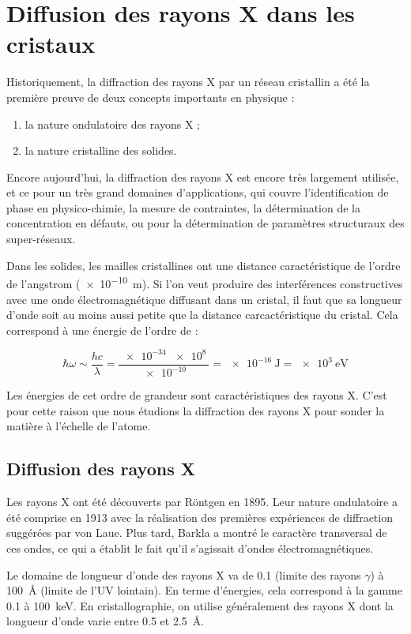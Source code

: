 \chapter{Diffusion des rayons X dans les cristaux}

Historiquement, la diffraction des rayons X par un réseau cristallin a été la première preuve de deux concepts importants en physique :
\begin{enumerate}
    \item la nature ondulatoire des rayons X ;
    \item la nature cristalline des solides.
\end{enumerate}
Encore aujourd'hui, la diffraction des rayons X est encore très largement utilisée, et ce pour un très grand domaines d'applications, qui couvre l'identification de phase en physico-chimie, la mesure de contraintes, la détermination de la concentration en défauts, ou pour la détermination de paramètres structuraux des super-réseaux.

Dans les solides, les mailles cristallines ont une distance caractéristique de l'ordre de l'angstrom (\SI{e-10}{\metre}). Si l'on veut produire des interférences constructives avec une onde électromagnétique diffusant dans un cristal, il faut que sa longueur d'onde soit au moins aussi petite que la distance carcactéristique du cristal. Cela correspond à une énergie de l'ordre de :

\begin{equation}
\hbar \omega \sim \frac{hc}{\lambda} = \frac{\SI{e-34}{}\SI{e8}{}}{\SI{e-10}{}} = \SI{e-16}{\joule} = \SI{e3}{\electronvolt}
\end{equation}

Les énergies de cet ordre de grandeur sont caractéristiques des rayons X. C'est pour cette raison que nous étudions la diffraction des rayons X pour sonder la matière à l'échelle de l'atome.

\section{Diffusion des rayons X}

Les rayons X ont été découverts par Röntgen en 1895. Leur nature ondulatoire a
été comprise en 1913 avec la réalisation des premières expériences de
diffraction suggérées par von Laue. Plus tard, Barkla a montré le caractère
transversal de ces ondes, ce qui a établit le fait qu'il s'agissait d'ondes
électromagnétiques.

Le domaine de longueur d'onde des rayons X va de 0.1 (limite des rayons
$\gamma$) à \SI{100}{\angstrom} (limite de l'UV lointain). En terme d'énergies,
cela correspond à la gamme 0.1 à \SI{100}{\kilo\electronvolt}. En
cristallographie, on utilise généralement des rayons X dont la longueur d'onde
varie entre 0.5 et \SI{2.5}{\angstrom}.

